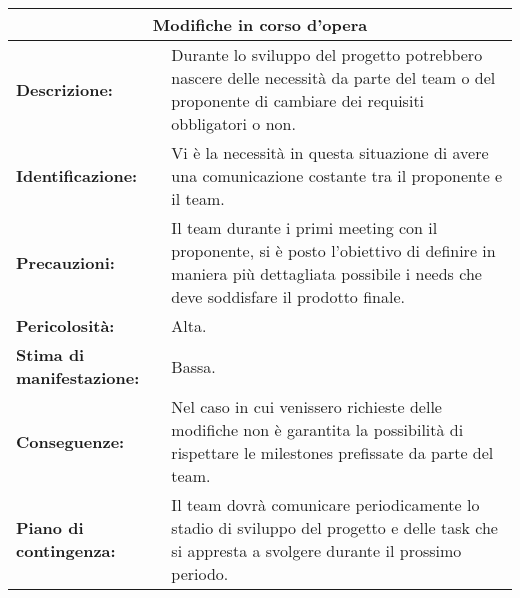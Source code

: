 \begin{tabular}{ |p{4cm}|p{10cm}|}
\hline
\multicolumn{2}{|c|}{\textbf{Modifiche in corso d'opera}} \\
\hline
\textbf{Descrizione:}& Durante lo sviluppo del progetto potrebbero nascere delle necessità da parte del team o del proponente di cambiare dei requisiti obbligatori o non.\\
\hline
\textbf{Identificazione:}& Vi è la necessità in questa situazione di avere una comunicazione costante tra il proponente e il team.\\
\hline
\textbf{Precauzioni:}& Il team durante i primi meeting con il proponente, si è posto l'obiettivo di definire in maniera più dettagliata possibile i needs che deve soddisfare il prodotto finale.\\
\hline
\textbf{Pericolosità:}& Alta.\\
\hline
\textbf{Stima di manifestazione:}& Bassa.\\
\hline
\textbf{Conseguenze:}& Nel caso in cui venissero richieste delle modifiche non è garantita la possibilità di rispettare le milestones prefissate da parte del team.\\
\hline
\textbf{Piano di contingenza:}& Il team dovrà comunicare periodicamente lo stadio di sviluppo del progetto e delle task che si appresta a svolgere durante il prossimo periodo.\\
\hline
\end{tabular}


